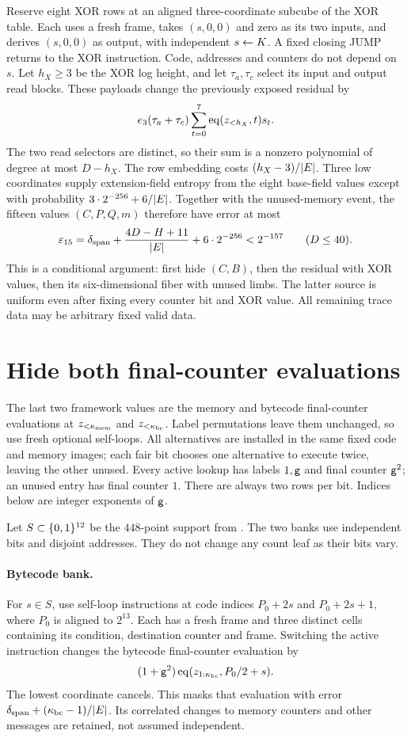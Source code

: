 \documentclass[11pt]{article}
\begin{document}
Reserve eight XOR rows at an aligned three-coordinate subcube of the XOR table. Each uses a fresh frame, takes $(s,0,0)$ and zero as its two inputs, and derives $(s,0,0)$ as output, with independent $s\gets K$. A fixed closing JUMP returns to the XOR instruction. Code, addresses and counters do not depend on $s$. Let $h_X\ge3$ be the XOR log height, and let $\tau_a,\tau_c$ select its input and output read blocks. These payloads change the previously exposed residual by
\[
 e_3(\tau_a+\tau_c)\sum_{t=0}^7\operatorname{eq}(z_{<h_X},t)s_t.
\]
The two read selectors are distinct, so their sum is a nonzero polynomial of degree at most $D-h_X$. The row embedding costs $(h_X-3)/|E|$. Three low coordinates supply extension-field entropy from the eight base-field values except with probability $3\cdot2^{-256}+6/|E|$. Together with the unused-memory event, the fifteen values $(C,P,Q,m)$ therefore have error at most
\[
 \varepsilon_{15}=\delta_{\mathrm{span}}+
 \frac{4D-H+11}{|E|}+6\cdot2^{-256}<2^{-157}\qquad(D\le40).
\]
This is a conditional argument: first hide $(C,B)$, then the residual with XOR values, then its six-dimensional fiber with unused limbs. The latter source is uniform even after fixing every counter bit and XOR value. All remaining trace data may be arbitrary fixed valid data.

\section{Hide both final-counter evaluations}

The last two framework values are the memory and bytecode final-counter evaluations at $z_{<\kappa_{\mathrm{mem}}}$ and $z_{<\kappa_{\mathrm{bc}}}$. Label permutations leave them unchanged, so use fresh optional self-loops. All alternatives are installed in the same fixed code and memory images; each fair bit chooses one alternative to execute twice, leaving the other unused. Every active lookup has labels $1,\mathsf{g}$ and final counter $\mathsf{g}^2$; an unused entry has final counter $1$. There are always two rows per bit. Indices below are integer exponents of $\mathsf{g}$.

Let $S\subset\{0,1\}^{12}$ be the $448$-point support from . The two banks use independent bits and disjoint addresses. They do not change any count leaf as their bits vary.

\paragraph{Bytecode bank.} For $s\in S$, use self-loop instructions at code indices $P_0+2s$ and $P_0+2s+1$, where $P_0$ is aligned to $2^{13}$. Each has a fresh frame and three distinct cells containing its condition, destination counter and frame. Switching the active instruction changes the bytecode final-counter evaluation by
\[
 (1+\mathsf{g}^2)\operatorname{eq}(z_{1:\kappa_{\mathrm{bc}}},P_0/2+s).
\]
The lowest coordinate cancels. This masks that evaluation with error $\delta_{\mathrm{span}}+(\kappa_{\mathrm{bc}}-1)/|E|$. Its correlated changes to memory counters and other messages are retained, not assumed independent.
\end{document}
